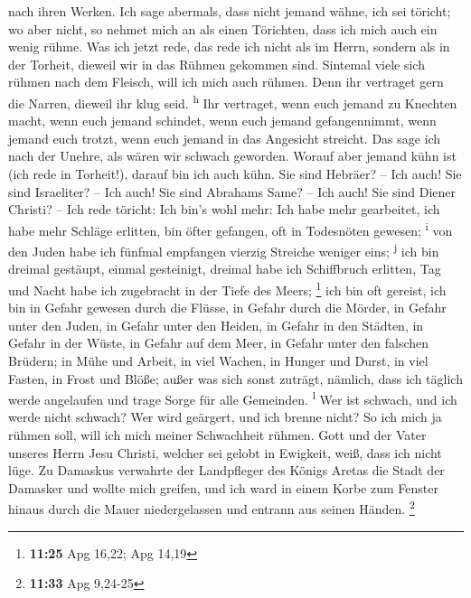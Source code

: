 nach ihren Werken.  Ich sage abermals, dass nicht jemand
wähne, ich sei töricht; wo aber nicht, so nehmet mich an als einen
Törichten, dass ich mich auch ein wenig rühme.  Was ich
jetzt rede, das rede ich nicht als im Herrn, sondern als in der Torheit,
dieweil wir in das Rühmen gekommen sind.  Sintemal viele
sich rühmen nach dem Fleisch, will ich mich auch rühmen. 
Denn ihr vertraget gern die Narren, dieweil ihr klug seid.
\textsuperscript{h}  Ihr vertraget, wenn euch jemand zu
Knechten macht, wenn euch jemand schindet, wenn euch jemand
gefangennimmt, wenn jemand euch trotzt, wenn euch jemand in das
Angesicht streicht.  Das sage ich nach der Unehre, als
wären wir schwach geworden. Worauf aber jemand kühn ist (ich rede in
Torheit!), darauf bin ich auch kühn.  Sie sind Hebräer?
-- Ich auch! Sie sind Israeliter? -- Ich auch! Sie sind Abrahams Same?
-- Ich auch!  Sie sind Diener Christi? -- Ich rede
töricht: Ich bin's wohl mehr: Ich habe mehr gearbeitet, ich habe mehr
Schläge erlitten, bin öfter gefangen, oft in Todesnöten gewesen;
\textsuperscript{i}  von den Juden habe ich fünfmal
empfangen vierzig Streiche weniger eins; \textsuperscript{j}
 ich bin dreimal gestäupt, einmal gesteinigt, dreimal
habe ich Schiffbruch erlitten, Tag und Nacht habe ich zugebracht in der
Tiefe des Meers; \footnote{\textbf{11:25} Apg 16,22; Apg 14,19}
 ich bin oft gereist, ich bin in Gefahr gewesen durch die
Flüsse, in Gefahr durch die Mörder, in Gefahr unter den Juden, in Gefahr
unter den Heiden, in Gefahr in den Städten, in Gefahr in der Wüste, in
Gefahr auf dem Meer, in Gefahr unter den falschen Brüdern;
 in Mühe und Arbeit, in viel Wachen, in Hunger und Durst,
in viel Fasten, in Frost und Blöße;  außer was sich sonst
zuträgt, nämlich, dass ich täglich werde angelaufen und trage Sorge für
alle Gemeinden. \textsuperscript{l}  Wer ist schwach, und
ich werde nicht schwach? Wer wird geärgert, und ich brenne nicht?
 So ich mich ja rühmen soll, will ich mich meiner
Schwachheit rühmen.  Gott und der Vater unseres Herrn
Jesu Christi, welcher sei gelobt in Ewigkeit, weiß, dass ich nicht lüge.
 Zu Damaskus verwahrte der Landpfleger des Königs Aretas
die Stadt der Damasker und wollte mich greifen,  und ich
ward in einem Korbe zum Fenster hinaus durch die Mauer niedergelassen
und entrann aus seinen Händen. \footnote{\textbf{11:33} Apg 9,24-25}

